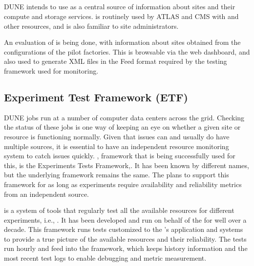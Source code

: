 \documentclass[../main-v1.tex]{subfiles}
\begin{document}
\subsection{} %

DUNE intends to use   as a central source of information about sites and their compute and storage services.  is routinely used by ATLAS and CMS with  and other  resources, and is also familiar to site administrators. 

An evaluation of  is being done, with information about sites obtained from the configurations of the  pilot factories. This is browsable via the  web dashboard, and also used to generate XML files in the  Feed format required by the  testing framework used for monitoring.

\subsection{Experiment Test Framework (ETF)}

DUNE jobs run at a number of computer data centers across the grid. Checking the status of these jobs is one way of keeping an eye on whether a given site or resource is functioning normally. Given that issues can and usually do have multiple sources, it is essential to have an independent resource monitoring system to %
catch issues quickly. %
, framework that is being successfully used for this, is the  %
 Experiments Tests Framework\cite{bib:ETFDoc},\cite{bib:ETFStatus}. It  has been known by different names, but the underlying framework remains the same. The  plans to support this framework for as long as  experiments require availability and reliability metrics from an independent source.
 
 is a system of tools that regularly test all the available resources for different experiments, i.e., . It has been developed and run on behalf of the  %
  for well over a decade. %
This framework runs tests customized to the 's application and systems to provide a true picture of the  available resources and their reliability. The  tests run hourly and feed into the  
framework, which keeps history information and the most recent test logs to enable debugging and metric measurement.
\end{document}
